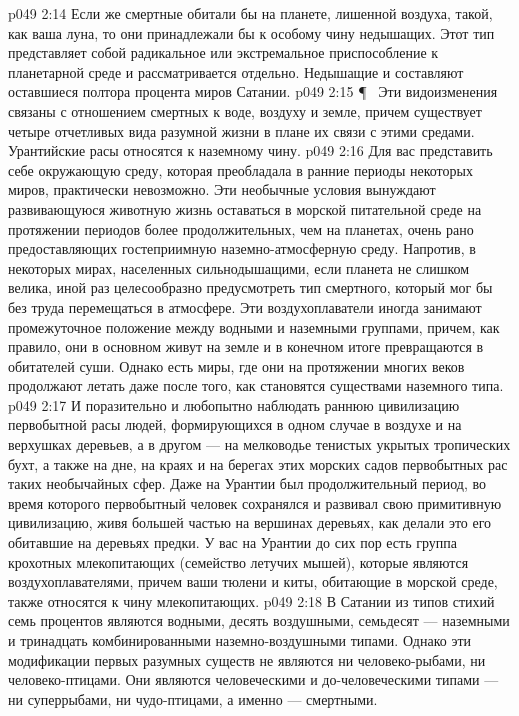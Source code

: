\vs p049 2:14 Если же смертные обитали бы на планете, лишенной воздуха, такой, как ваша луна, то они принадлежали бы к особому чину недышащих. Этот тип представляет собой радикальное или экстремальное приспособление к планетарной среде и рассматривается отдельно. Недышащие и составляют оставшиеся полтора процента миров Сатании.
\vs p049 2:15 \P\ \bibnobreakspace {} Эти видоизменения связаны с отношением смертных к воде, воздуху и земле, причем существует четыре отчетливых вида разумной жизни в плане их связи с этими средами. Урантийские расы относятся к наземному чину.
\vs p049 2:16 Для вас представить себе окружающую среду, которая преобладала в ранние периоды некоторых миров, практически невозможно. Эти необычные условия вынуждают развивающуюся животную жизнь оставаться в морской питательной среде на протяжении периодов более продолжительных, чем на планетах, очень рано предоставляющих гостеприимную наземно\hyp{}атмосферную среду. Напротив, в некоторых мирах, населенных сильнодышащими, если планета не слишком велика, иной раз целесообразно предусмотреть тип смертного, который мог бы без труда перемещаться в атмосфере. Эти воздухоплаватели иногда занимают промежуточное положение между водными и наземными группами, причем, как правило, они в основном живут на земле и в конечном итоге превращаются в обитателей суши. Однако есть миры, где они на протяжении многих веков продолжают летать даже после того, как становятся существами наземного типа.
\vs p049 2:17 И поразительно и любопытно наблюдать раннюю цивилизацию первобытной расы людей, формирующихся в одном случае в воздухе и на верхушках деревьев, а в другом --- на мелководье тенистых укрытых тропических бухт, а также на дне, на краях и на берегах этих морских садов первобытных рас таких необычайных сфер. Даже на Урантии был продолжительный период, во время которого первобытный человек сохранялся и развивал свою примитивную цивилизацию, живя большей частью на вершинах деревьях, как делали это его обитавшие на деревьях предки. У вас на Урантии до сих пор есть группа крохотных млекопитающих (семейство летучих мышей), которые являются воздухоплавателями, причем ваши тюлени и киты, обитающие в морской среде, также относятся к чину млекопитающих.
\vs p049 2:18 В Сатании из типов стихий семь процентов являются водными, десять воздушными, семьдесят --- наземными и тринадцать комбинированными наземно\hyp{}воздушными типами. Однако эти модификации первых разумных существ не являются ни человеко\hyp{}рыбами, ни человеко\hyp{}птицами. Они являются человеческими и до\hyp{}человеческими типами --- ни суперрыбами, ни чудо\hyp{}птицами, а именно --- смертными.
